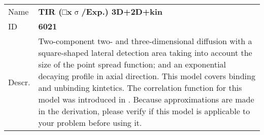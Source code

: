 \noindent \begin{tabular}{lp{}}
Name & \textbf{TIR (□x$\upsigma$/Exp.) 3D+2D+kin} \\ 
ID & \textbf{6021} \\ 
Descr. &  Two-component two- and three-dimensional diffusion with a square-shaped lateral detection area taking into account the size of the point spread function; and an exponential decaying profile in axial direction. This model covers binding and unbinding kintetics.  \newline 
The correlation function for this model was introduced in \cite{Ries2008}. Because approximations are made in the derivation, please verify if this model is applicable to your problem before using it.
\end{tabular}


